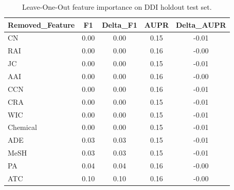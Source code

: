 \begin{table}[htbp]
\centering
\caption{Leave-One-Out feature importance on DDI holdout test set.}
\label{tab:ablation_loo}
\begin{tabular}{lcccc}
\toprule
Removed_Feature & F1 & Delta_F1 & AUPR & Delta_AUPR \\
\midrule
CN & 0.00 & 0.00 & 0.15 & -0.01 \\
RAI & 0.00 & 0.00 & 0.16 & -0.00 \\
JC & 0.00 & 0.00 & 0.15 & -0.01 \\
AAI & 0.00 & 0.00 & 0.16 & -0.00 \\
CCN & 0.00 & 0.00 & 0.16 & -0.01 \\
CRA & 0.00 & 0.00 & 0.15 & -0.01 \\
WIC & 0.00 & 0.00 & 0.15 & -0.01 \\
Chemical & 0.00 & 0.00 & 0.15 & -0.01 \\
ADE & 0.03 & 0.03 & 0.15 & -0.01 \\
MeSH & 0.03 & 0.03 & 0.15 & -0.01 \\
PA & 0.04 & 0.04 & 0.16 & -0.00 \\
ATC & 0.10 & 0.10 & 0.16 & -0.00 \\
\bottomrule
\end{tabular}
\end{table}